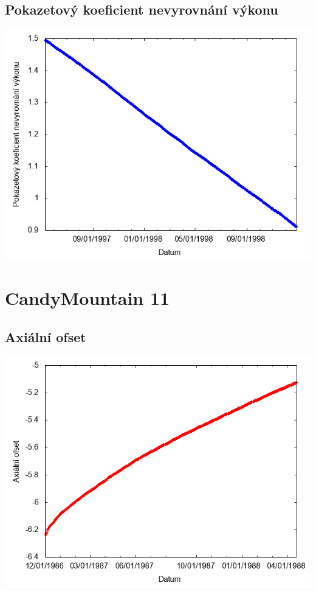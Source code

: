 \documentclass[a4paper,twoside,11pt]{article}
\begin{document}
\subsection*{Pokazetový koeficient nevyrovnání výkonu}
\begin{center}
\includegraphics[width=.8\textwidth]{graphs/CandyMountain_10_fha.png}
\end{center}

\newpage
\section*{CandyMountain 11}
\subsection*{Axiální ofset}
\begin{center}
\includegraphics[width=.8\textwidth]{graphs/CandyMountain_11_ao.png}
\end{center}
\end{document}
